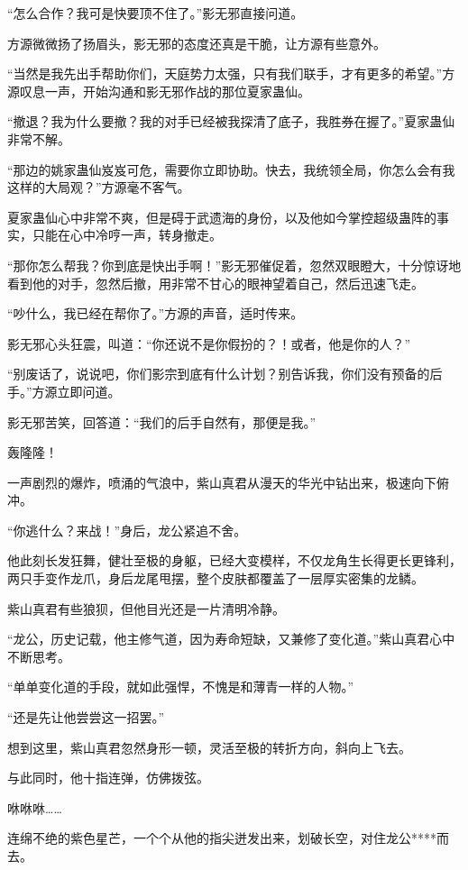 \begin{this_body}
“怎么合作？我可是快要顶不住了。”影无邪直接问道。

方源微微扬了扬眉头，影无邪的态度还真是干脆，让方源有些意外。

“当然是我先出手帮助你们，天庭势力太强，只有我们联手，才有更多的希望。”方源叹息一声，开始沟通和影无邪作战的那位夏家蛊仙。

“撤退？我为什么要撤？我的对手已经被我探清了底子，我胜券在握了。”夏家蛊仙非常不解。

“那边的姚家蛊仙岌岌可危，需要你立即协助。快去，我统领全局，你怎么会有我这样的大局观？”方源毫不客气。

夏家蛊仙心中非常不爽，但是碍于武遗海的身份，以及他如今掌控超级蛊阵的事实，只能在心中冷哼一声，转身撤走。

“那你怎么帮我？你到底是快出手啊！”影无邪催促着，忽然双眼瞪大，十分惊讶地看到他的对手，忽然后撤，用非常不甘心的眼神望着自己，然后迅速飞走。

“吵什么，我已经在帮你了。”方源的声音，适时传来。

影无邪心头狂震，叫道：“你还说不是你假扮的？！或者，他是你的人？”

“别废话了，说说吧，你们影宗到底有什么计划？别告诉我，你们没有预备的后手。”方源立即问道。

影无邪苦笑，回答道：“我们的后手自然有，那便是我。”

轰隆隆！

一声剧烈的爆炸，喷涌的气浪中，紫山真君从漫天的华光中钻出来，极速向下俯冲。

“你逃什么？来战！”身后，龙公紧追不舍。

他此刻长发狂舞，健壮至极的身躯，已经大变模样，不仅龙角生长得更长更锋利，两只手变作龙爪，身后龙尾甩摆，整个皮肤都覆盖了一层厚实密集的龙鳞。

紫山真君有些狼狈，但他目光还是一片清明冷静。

“龙公，历史记载，他主修气道，因为寿命短缺，又兼修了变化道。”紫山真君心中不断思考。

“单单变化道的手段，就如此强悍，不愧是和薄青一样的人物。”

“还是先让他尝尝这一招罢。”

想到这里，紫山真君忽然身形一顿，灵活至极的转折方向，斜向上飞去。

与此同时，他十指连弹，仿佛拨弦。

咻咻咻……

连绵不绝的紫色星芒，一个个从他的指尖迸发出来，划破长空，对住龙公****而去。


\end{this_body}
